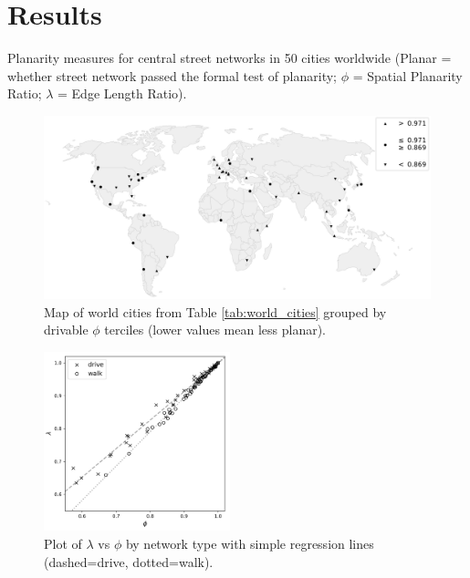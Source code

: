 \documentclass[Afour,sageh,times]{sagej}
\begin{document}
\section{Results}

\begin{table}[htbp]
	\centering
	\caption{Planarity measures for central street networks in 50 cities worldwide (Planar = whether street network passed the formal test of planarity; $\phi$ = Spatial Planarity Ratio; $\lambda$ = Edge Length Ratio).}
	\label{tab:world_cities}
	
\end{table}

\begin{figure}[htbp]
	\center
	\includegraphics[width=\textwidth]{figures_tables/world_map_bw.png}
	\caption{Map of world cities from Table \ref{tab:world_cities} grouped by drivable $\phi$ terciles (lower values mean less planar).}
	\label{fig:world_map_bw}
\end{figure}

\begin{figure}[htbp]
	\includegraphics[width=0.48\textwidth]{figures_tables/regression_lambda_phi_linear.png}
	\caption{Plot of $\lambda$ vs $\phi$ by network type with simple regression lines (dashed=drive, dotted=walk).}
	\label{fig:regression_lambda_phi}
\end{figure}
\end{document}
